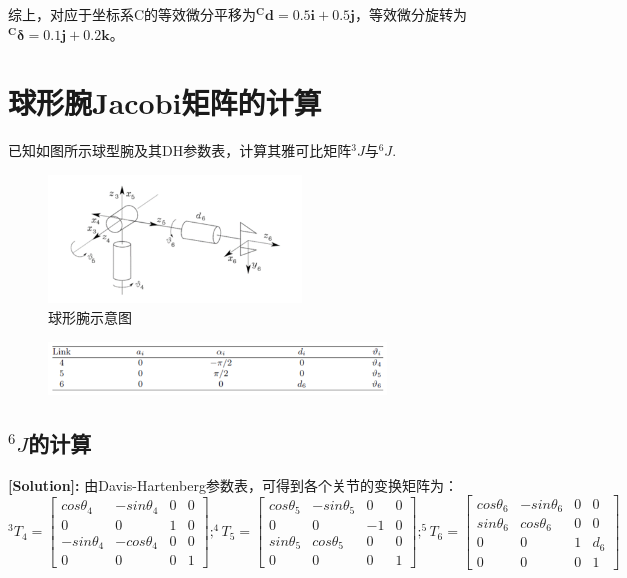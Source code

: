 \documentclass{ctexart}
\begin{document}
综上，对应于坐标系{C}的等效微分平移为$\mathbf{^Cd}=0.5\mathbf{i}+0.5\mathbf{j}$，等效微分旋转为$\mathbf{^C\delta}=0.1\mathbf{j}+0.2\mathbf{k}$。

\section{球形腕Jacobi矩阵的计算}

已知如图所示球型腕及其DH参数表，计算其雅可比矩阵$^3J$与$^6J$.

\begin{figure}[h]
	\centering
	\includegraphics[width=0.6\textwidth]{Image/1.png}
	\caption{球形腕示意图}
\end{figure}
\begin{figure}[h]
	\centering
	\includegraphics[width=0.8\textwidth]{Image/2.png}
\end{figure}

\subsection{$^6J$的计算}

\textbf{[Solution]:}
由Davis-Hartenberg参数表，可得到各个关节的变换矩阵为：
\begin{equation*}
	^3T_4=\begin{bmatrix}
		cos \theta_4 & -sin \theta_4 & 0 & 0 \\
		0 & 0 & 1 & 0 \\
		-sin \theta_4 & -cos \theta_4 & 0 & 0 \\
		0 & 0 & 0 & 1
	\end{bmatrix} ;
	^4T_5=\begin{bmatrix}
		cos \theta_5 & -sin \theta_5 & 0 & 0 \\
		0 & 0 & -1 & 0 \\
		sin \theta_5 & cos \theta_5 & 0 & 0 \\
		0 & 0 & 0 & 1
	\end{bmatrix} ;
	^5T_6=\begin{bmatrix}
		cos \theta_6 & -sin \theta_6 & 0 & 0 \\
		sin \theta_6 & cos \theta_6 & 0 & 0 \\
		0 & 0 & 1 & d_6\\
		0 & 0 & 0 & 1
	\end{bmatrix}
\end{equation*}
\end{document}
